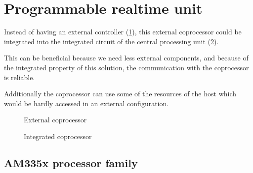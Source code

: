 \section{Programmable realtime unit}

Instead of having an external controller (\cref{fig:ext_controller_hw}), this external coprocessor could be integrated into the integrated circuit of the central processing unit (\cref{fig:int_controller_hw}).

This can be beneficial because we need less external components, and because of the integrated property of this solution, the communication with the coprocessor is reliable.

Additionally the coprocessor can use some of the resources of the host \cpu which would be hardly accessed in an external configuration.

\begin{figure}[h]
	\centering
	\caption{External coprocessor}
	\label{fig:ext_controller_hw}
\end{figure}

\begin{figure}[h]
	\centering
	\caption{Integrated coprocessor}
	\label{fig:int_controller_hw}
\end{figure}

\subsection{AM335x processor family}

